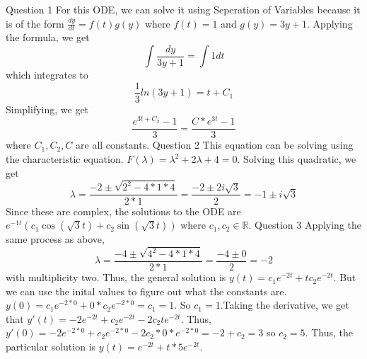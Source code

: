 \documentclass[12pt]{exam}
\begin{document}
\begin{questions}
\question Question 1\newline
For this ODE, we can solve it using Seperation of Variables because it is of the form $\frac{dy}{dt} = f(t)g(y)$ where $f(t) = 1$ and $g(y) = 3y+1$. Applying the formula, we get \[\int \frac{dy}{3y+1} = \int 1 dt\] which integrates to \[\frac{1}{3}ln(3y+1) = t+C_1\]
Simplifying, we get \[\frac{e^{3t+C_2}-1}{3} =\frac{C*e^{3t}-1}{3} \] where $C_1, C_2, C$ are all constants. 
\question Question 2\newline 
This equation can be solving using the characteristic equation. $F(\lambda) = \lambda^2+2\lambda+4=0$. Solving this quadratic, we get \[\lambda = \frac{-2\pm\sqrt{2^2-4*1*4}}{2*1} = \frac{-2\pm 2i\sqrt{3}}{2} = -1\pm i\sqrt{3}\] Since these are complex, the solutions to the ODE are $e^{-1t}(c_1\cos(\sqrt{3}t)+ c_2\sin(\sqrt{3}t))$ where $c_1, c_2 \in \mathbb{R}$.
\question Question 3\newline
Applying the same process as above, \[\lambda = \frac{-4\pm\sqrt{4^2-4*1*4}}{2*1} = \frac{-4\pm 0}{2} = -2\] with multiplicity two. Thus, the general solution is $y(t)= c_1e^{-2t}+tc_2e^{-2t}$. But we can use the inital values to figure out what the constants are. $y(0) = c_1e^{-2*0}+0*c_2e^{-2*0} = c_1 = 1$. So $c_1 = 1$.Taking the derivative, we get that $y'(t) = -2e^{-2t}+c_2e^{-2t}-2c_2te^{-2t}$. Thus, $y'(0) = -2e^{-2*0}+c_2e^{-2*0}-2c_2*0*e^{-2*0} = -2+c_2 = 3$ so $c_2 = 5$. Thus, the particular solution is $y(t)= e^{-2t}+t*5e^{-2t}$.

\end{questions}
\end{document}
